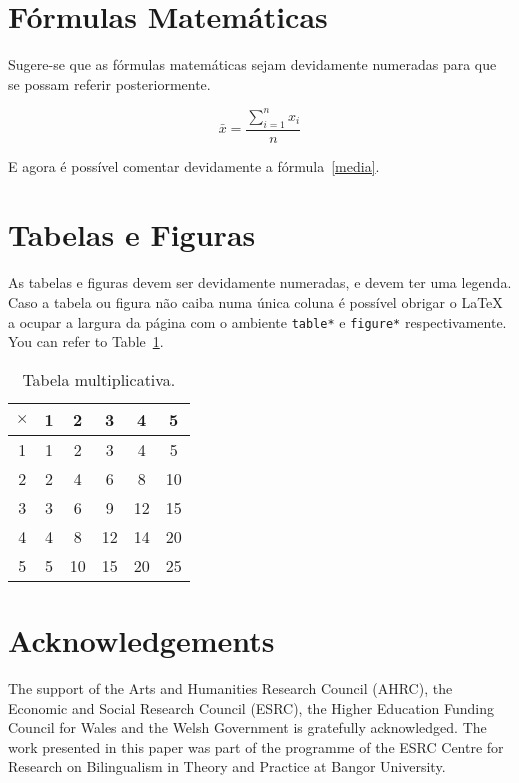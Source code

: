 \documentclass[a4paper, twocolumn, 11pt, twoside]{article}
\begin{document}
\section{Fórmulas Matemáticas}

Sugere-se que as fórmulas matemáticas sejam devidamente numeradas para que se possam referir posteriormente.

\begin{equation}
\bar{x} = \frac{\sum_{i=1}^n x_i}{n}
\label{media}
\end{equation}

E agora é possível comentar devidamente a fórmula~\ref{media}.


\section{Tabelas e Figuras}

As tabelas e figuras devem ser devidamente numeradas, e devem ter uma legenda. Caso a tabela ou figura não caiba numa única coluna é possível obrigar o \LaTeX{} a ocupar a largura da página com o ambiente \verb!table*! e \verb!figure*! respectivamente.  You can refer to Table~\ref{tab1}.

\begin{table}
\centering
\begin{tabular}{|c|ccccc|}
\hline
$\times$ & 1 & 2 & 3 & 4 & 5 \\
\hline
1 & 1 & 2 & 3 & 4 & 5 \\
2 & 2 & 4 & 6 & 8 & 10 \\
3 & 3 & 6 & 9 & 12 & 15 \\
4 & 4 & 8 & 12 & 14 & 20 \\
5 & 5 & 10 & 15 & 20 & 25 \\
\hline
\end{tabular}
\caption{Tabela multiplicativa.}
\label{tab1}
\end{table}


\section*{Acknowledgements}

The support of the Arts and Humanities Research Council (AHRC), the Economic and Social Research Council (ESRC), the Higher Education Funding Council for Wales and the Welsh Government is gratefully acknowledged. The work presented in this paper was part of the programme of the ESRC Centre for Research on Bilingualism in Theory and Practice at Bangor University.






\end{document}
